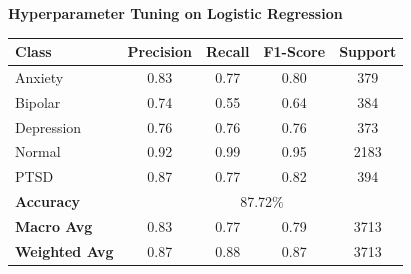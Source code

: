 \begin{center}
    \textbf{Hyperparameter Tuning on Logistic Regression} \\[0.2em]
    \begin{tabular}{|l|c|c|c|c|}
        \hline
        \textbf{Class} & \textbf{Precision} & \textbf{Recall} & \textbf{F1-Score} & \textbf{Support} \\ \hline
        Anxiety        & 0.83               & 0.77            & 0.80              & 379             \\ \hline
        Bipolar        & 0.74               & 0.55            & 0.64              & 384             \\ \hline
        Depression     & 0.76               & 0.76            & 0.76              & 373             \\ \hline
        Normal         & 0.92               & 0.99            & 0.95              & 2183            \\ \hline
        PTSD           & 0.87               & 0.77            & 0.82              & 394             \\ \hline
        \textbf{Accuracy} & \multicolumn{4}{|c|}{87.72\%} \\ \hline
        \textbf{Macro Avg} & 0.83            & 0.77            & 0.79              & 3713            \\ \hline
        \textbf{Weighted Avg} & 0.87         & 0.88            & 0.87              & 3713            \\ \hline
    \end{tabular}
\end{center}

\pagebreak

